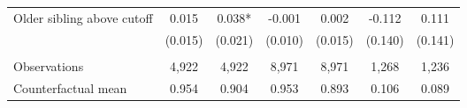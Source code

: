 {{\begin{tabular}{lcccccc}
Older sibling above cutoff&       0.015   &       0.038*  &      -0.001   &       0.002   &      -0.112   &       0.111   \\
                    &     (0.015)   &     (0.021)   &     (0.010)   &     (0.015)   &     (0.140)   &     (0.141)   \\
                    &               &               &               &               &               &               \\
Observations        &       4,922   &       4,922   &       8,971   &       8,971   &       1,268   &       1,236   \\
Counterfactual mean &       0.954   &       0.904   &       0.953   &       0.893   &       0.106   &       0.089   \\
 

\bottomrule
\end{tabular}
}
}
